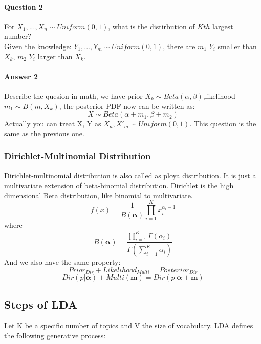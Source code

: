 \documentclass{article}
\begin{document}
\paragraph{Question 2} For $X_{1},...,X_{n} \sim Uniform(0,1)$, what is the distirbution of $Kth$ largest number? \\
Given the knowledge: $Y_{1},...,Y_{m} \sim Uniform(0,1)$, there are $m_{1}$ $Y_{i}$ smaller than $X_{k}$, $m_{2}$ $Y_{i}$ larger than $X_{k}$.

\paragraph{Answer 2}
Describe the quesion in math, we have prior $X_{k} \sim Beta(\alpha,\beta)$,likelihood $m_{1} \sim B(m,X_{k})$, the posterior PDF now can be written as:
$$X \sim Beta(\alpha+m_{1},\beta+m_{2})$$
Actually you can treat X, Y as $X_{n},X'_{m} \sim Uniform(0,1)$. This question is the same as the previous one.

\subsubsection{Dirichlet-Multinomial Distribution}
Dirichlet-multinomial distribution is also called as ploya distribution. It is just a multivariate extension of beta-binomial distribution. Dirichlet is the high dimensional Beta distribution, like binomial to multivariate.
$$f(x)=\frac{1}{B(\bm{\alpha} )}\prod_{i=1}^{K}x_{i}^{\alpha_{i}-1}$$
where 
$$B(\bm{\alpha})=\frac{\prod_{i=1}^{K} \Gamma(\alpha_{i})}{\Gamma(\sum_{i=1}^{K}\alpha_{i})}$$
And we also have the same property:
$$Prior_{Dir} + Likelihood_{Multi} = Posterior_{Dir}$$
$$Dir(p|\bm{\alpha})+Multi(\bm{m})=Dir(p|\bm{\alpha+m})$$
\subsection{Steps of LDA}
Let K be a specific number of topics and V the size of vocabulary. LDA defines the following generative process: 
\end{document}

